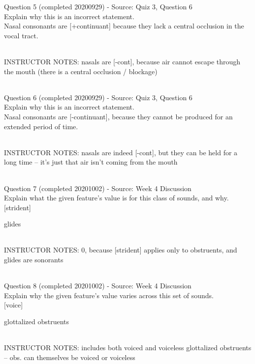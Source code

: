 \documentclass[12pt]{article}
\begin{document}
{\large Question 5} (completed 20200929) - Source: Quiz 3, Question 6\\

Explain why this is an incorrect statement.\\

Nasal consonants are {[+continuant]} because they lack a central occlusion in the vocal tract.


~\\
INSTRUCTOR NOTES: nasals are [-cont], because air cannot escape through the mouth (there is a central occlusion / blockage)


~\\

{\large Question 6} (completed 20200929) - Source: Quiz 3, Question 6\\

Explain why this is an incorrect statement.\\

Nasal consonants are {[-continuant]}, because they cannot be produced for an extended period of time.


~\\
INSTRUCTOR NOTES: nasals are indeed [-cont], but they can be held for a long time -- it's just that air isn't coming from the mouth


~\\

{\large Question 7} (completed 20201002) - Source: Week 4 Discussion\\

Explain what the given feature’s value is for this class of sounds, and why.\\

{[strident]}

glides


~\\
INSTRUCTOR NOTES: 0, because [strident] applies only to obstruents, and glides are sonorants


~\\

{\large Question 8} (completed 20201002) - Source: Week 4 Discussion\\

Explain why the given feature's value varies across this set of sounds.\\

{[voice]}

glottalized obstruents


~\\
INSTRUCTOR NOTES: includes both voiced and voiceless glottalized obstruents -- obs. can themselves be voiced or voiceless
\end{document}
